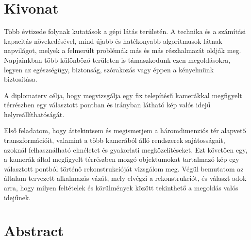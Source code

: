 
\hungarianParagraph

\chapter*{Kivonat}

Több évtizede folynak kutatások a gépi látás területén. A technika és a számítási kapacitás növekedésével, mind újabb és hatékonyabb algoritmusok látnak napvilágot, melyek a felmerült problémák más és más részhalmazát oldják meg. Napjainkban több különböző területen is támaszkodunk ezen megoldásokra, legyen az egészségügy, biztonság, szórakozás vagy éppen a kényelmünk biztosítása.

A diplomaterv célja, hogy megvizsgálja egy fix telepítésű kamerákkal megfigyelt térrészben egy választott pontban és irányban látható kép valós idejű helyreállíthatóságát.

Első feladatom, hogy áttekintsem és megismerjem a háromdimenziós tér alapvető transzformációit, valamint a több kamerából álló rendszerek sajátosságait, azoknál felhasználható elméletet és gyakorlati megközelítéseket. Ezt követően egy, a kamerák által megfigyelt térrészben mozgó objektumokat tartalmazó kép egy választott pontból történő rekonstrukcióját vizsgálom meg. Végül bemutatom az általam tervezett alkalmazás vázát, mely elvégzi a rekonstrukciót, és választ adok arra, hogy milyen feltételek és körülmények között tekinthető a megoldás valós idejűnek.


\vfill


\englishParagraph

\chapter*{Abstract}

\vfill



\dolgozatnyelve
{}

\setcounter{romanPage}{\value{page}}
